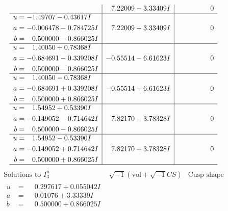 \documentclass[1p]{elsarticle_modified}
\theoremstyle{definition}
\newcommand{\I}{\sqrt{-1}}
\begin{document}
$$\begin{array}{c|c|c}
 & \phantom{-}7.22009 - 3.33409 I & \phantom{-0.000000 } 0 \\ \hline\begin{aligned}
u &= -1.49707 - 0.43617 I \\
a &= -0.006478 - 0.784725 I \\
b &= \phantom{-}0.500000 - 0.866025 I\end{aligned}
 & \phantom{-}7.22009 + 3.33409 I & \phantom{-0.000000 } 0 \\ \hline\begin{aligned}
u &= \phantom{-}1.40050 + 0.78368 I \\
a &= -0.684691 - 0.339208 I \\
b &= \phantom{-}0.500000 - 0.866025 I\end{aligned}
 & -0.55514 - 6.61623 I & \phantom{-0.000000 } 0 \\ \hline\begin{aligned}
u &= \phantom{-}1.40050 - 0.78368 I \\
a &= -0.684691 + 0.339208 I \\
b &= \phantom{-}0.500000 + 0.866025 I\end{aligned}
 & -0.55514 + 6.61623 I & \phantom{-0.000000 } 0 \\ \hline\begin{aligned}
u &= \phantom{-}1.54952 + 0.53390 I \\
a &= -0.149052 - 0.714642 I \\
b &= \phantom{-}0.500000 - 0.866025 I\end{aligned}
 & \phantom{-}7.82170 - 3.78328 I & \phantom{-0.000000 } 0 \\ \hline\begin{aligned}
u &= \phantom{-}1.54952 - 0.53390 I \\
a &= -0.149052 + 0.714642 I \\
b &= \phantom{-}0.500000 + 0.866025 I\end{aligned}
 & \phantom{-}7.82170 + 3.78328 I & \phantom{-0.000000 } 0\\
 \hline 
 \end{array}$$\newpage$$\begin{array}{c|c|c}  
\text{Solutions to }I^u_{3}& \I (\text{vol} + \sqrt{-1}CS) & \text{Cusp shape}\\
 \hline 
\begin{aligned}
u &= \phantom{-}0.297617 + 0.055042 I \\
a &= \phantom{-}0.01076 + 3.33339 I \\
b &= \phantom{-}0.500000 + 0.866025 I\end{aligned}

\end{array}$$
\end{document}
